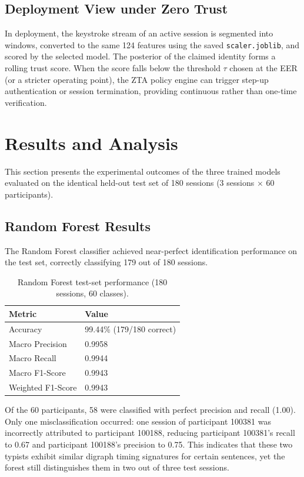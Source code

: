 \subsection{Deployment View under Zero Trust}
In deployment, the keystroke stream of an active session is segmented into windows, converted to the same 124 features using the saved \texttt{scaler.joblib}, and scored by the selected model. The posterior of the claimed identity forms a rolling trust score. When the score falls below the threshold $\tau$ chosen at the EER (or a stricter operating point), the ZTA policy engine can trigger step-up authentication or session termination, providing continuous rather than one-time verification.

\section{Results and Analysis}
\label{sec:results}

This section presents the experimental outcomes of the three trained models evaluated on the identical held-out test set of 180 sessions (3 sessions $\times$ 60 participants).

\subsection{Random Forest Results}
The Random Forest classifier achieved near-perfect identification performance on the test set, correctly classifying 179 out of 180 sessions.

\begin{table}[H]
\centering
\caption{Random Forest test-set performance (180 sessions, 60 classes).}
\begin{tabular}{@{}ll@{}}
\toprule
\textbf{Metric} & \textbf{Value} \\ \midrule
Accuracy & 99.44\% (179/180 correct) \\
Macro Precision & 0.9958 \\
Macro Recall & 0.9944 \\
Macro F1-Score & 0.9943 \\
Weighted F1-Score & 0.9943 \\ \bottomrule
\end{tabular}
\end{table}

Of the 60 participants, 58 were classified with perfect precision and recall (1.00). Only one misclassification occurred: one session of participant 100381 was incorrectly attributed to participant 100188, reducing participant 100381's recall to 0.67 and participant 100188's precision to 0.75. This indicates that these two typists exhibit similar digraph timing signatures for certain sentences, yet the forest still distinguishes them in two out of three test sessions.

